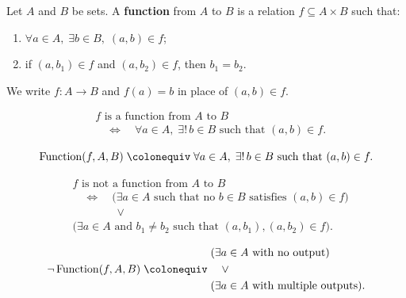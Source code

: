 
\begin{tcolorbox}[title={Definition --- Function}]
\begin{definition}[Function]
\label{def:alg-function}
Let $A$ and $B$ be sets.
A \textbf{function} from $A$ to $B$ is a relation $f \subseteq A \times B$
such that:
\begin{enumerate}[label=(\roman*)]
  \item $\forall a \in A,\; \exists b \in B,\; (a,b) \in f$;
  \item if $(a,b_1) \in f$ and $(a,b_2) \in f$, then $b_1 = b_2$.
\end{enumerate}
We write $f : A \to B$ and $f(a) = b$ in place of $(a,b) \in f$.
\end{definition}
\end{tcolorbox}

\begin{remark*}
\[
\begin{aligned}
&f \text{ is a function from } A \text{ to } B \\
&\quad\Longleftrightarrow\quad
\forall a \in A,\; \exists!\, b \in B \text{ such that } (a,b) \in f.
\end{aligned}
\]
\end{remark*}

\begin{remark*}
\[
\operatorname{Function}(f,A,B)
\;\colonequiv\;
\forall a \in A,\; \exists!\, b \in B \text{ such that } (a,b) \in f.
\]
\end{remark*}

\begin{remark*}
\[
\begin{aligned}
&f \text{ is not a function from } A \text{ to } B \\
&\quad\Longleftrightarrow\quad
\bigl(\exists a \in A \text{ such that no } b \in B \text{ satisfies } (a,b)\in f\bigr) \\
&\qquad\qquad \lor \\
&\bigl(\exists a \in A \text{ and } b_1 \ne b_2 \text{ such that } (a,b_1),(a,b_2)\in f\bigr).
\end{aligned}
\]
\end{remark*}

\begin{remark*}
\[
\neg \operatorname{Function}(f,A,B)
\;\colonequiv\;
\begin{aligned}
&(\exists a \in A \text{ with no output}) \\
&\quad \lor \\
&(\exists a \in A \text{ with multiple outputs}).
\end{aligned}
\]
\end{remark*}

